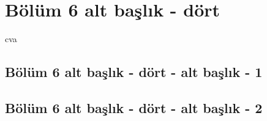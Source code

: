 \lipsum[24]
\newpage
\section{Bölüm 6 alt başlık - dört}

\acrfull{cva}

\vspace{0.5cm}
\subsection{Bölüm 6 alt başlık - dört - alt başlık - 1}

\lipsum[10-12]

\subsection{Bölüm 6 alt başlık - dört - alt başlık - 2}

\lipsum[14-16]